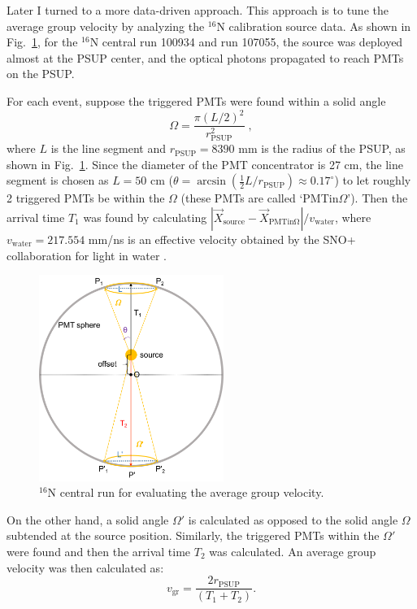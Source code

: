 Later I turned to a more data-driven approach. This approach is to tune the average group velocity by analyzing the $^{16}$N calibration source data. As shown in Fig.~\ref{fig:n16_groupVeloctiy}, for the $^{16}$N central run 100934 and run 107055, the source was deployed almost at the PSUP center, and the optical photons propagated to reach PMTs on the PSUP. 

For each event, suppose the triggered PMTs were found within a solid angle
\begin{equation*}
\Omega=\frac{\pi(L/2)^2}{r^2_\mathrm{PSUP}}\; ,
\end{equation*}
where $L$ is the line segment and $r_\mathrm{PSUP}=8390$ mm is the radius of the PSUP, as shown in Fig.~\ref{fig:n16_groupVeloctiy}. Since the diameter of the PMT concentrator is 27 cm, the line segment is chosen as $L = 50$ cm ($\theta=\arcsin(\frac{1}{2}L/r_\mathrm{PSUP})\approx 0.17^\circ$) to let roughly 2 triggered PMTs be within the $\Omega$ (these PMTs are called `PMTin$\Omega$'). Then the arrival time $T_1$ was found by calculating $|\vec{X}_\mathrm{source}-\vec{X}_\mathrm{PMTin\Omega}|/v_\mathrm{water}$, where $v_\mathrm{water}=217.554$ mm/ns is an effective velocity obtained by the SNO+ collaboration for light in water \cite{coulter2013modelling}.

\begin{figure}[!htb]
	\centering
	\includegraphics[width=6cm]{n16_groupVelocity.png}
	\caption{$^{16}$N central run for evaluating the average group velocity.}
	\label{fig:n16_groupVeloctiy}
\end{figure}

On the other hand, a solid angle $\Omega'$ is calculated as opposed to the solid angle $\Omega$ subtended at the source position. Similarly, the triggered PMTs within the $\Omega'$ were found and then the arrival time $T_2$ was calculated. An average group velocity was then calculated as:
\begin{equation}
v_\mathrm{gr}=\frac{2 r_\mathrm{PSUP}}{(T_1+T_2)}.
\end{equation}

